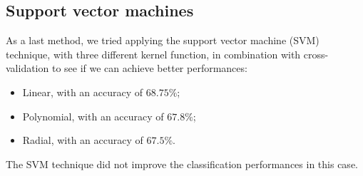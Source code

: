 \subsection{Support vector machines}

As a last method, we tried applying the support vector machine (SVM) technique, with three different kernel function, in combination with cross-validation to see if we can achieve better performances:
\begin{itemize}
	\item Linear, with an accuracy of $68.75\%$;
	\item Polynomial, with an accuracy of $67.8\%$;
	\item Radial, with an accuracy of $67.5\%$.
\end{itemize} 

The SVM technique did not improve the classification performances in this case.